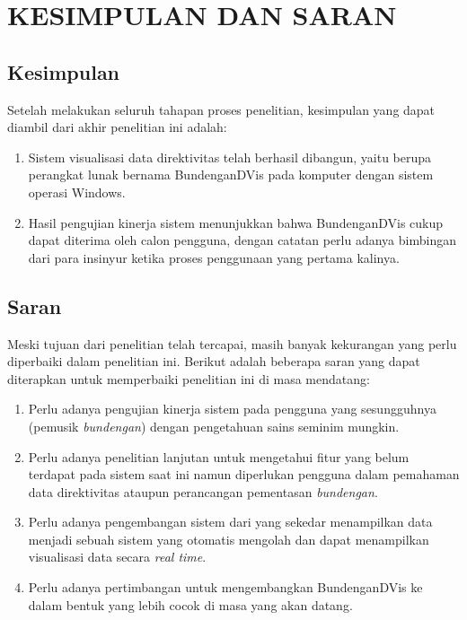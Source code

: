 \chapter{KESIMPULAN DAN SARAN} \label{kesimpulan-dan-saran}

\section{Kesimpulan}
Setelah melakukan seluruh tahapan proses penelitian, kesimpulan yang dapat diambil dari akhir penelitian ini adalah:
\begin{enumerate}
	\item Sistem visualisasi data direktivitas \bundengan telah berhasil dibangun, yaitu berupa perangkat lunak bernama BundenganDVis pada komputer dengan sistem operasi Windows.
	\item Hasil pengujian kinerja sistem menunjukkan bahwa BundenganDVis cukup dapat diterima oleh calon pengguna, dengan catatan perlu adanya bimbingan dari para insinyur ketika proses penggunaan yang pertama kalinya.
\end{enumerate}


\section{Saran}
Meski tujuan dari penelitian telah tercapai, masih banyak kekurangan yang perlu diperbaiki dalam penelitian ini. Berikut adalah beberapa saran yang dapat diterapkan untuk memperbaiki penelitian ini di masa mendatang:
\begin{enumerate}
	\item Perlu adanya pengujian kinerja sistem pada pengguna yang sesungguhnya (pemusik \emph{bundengan}) dengan pengetahuan sains seminim mungkin.
	\item Perlu adanya penelitian lanjutan untuk mengetahui fitur yang belum terdapat pada sistem saat ini namun diperlukan pengguna dalam pemahaman data direktivitas \bundengan ataupun perancangan pementasan \emph{bundengan}.
	\newpage
	\item Perlu adanya pengembangan sistem dari yang sekedar menampilkan data menjadi sebuah sistem yang otomatis mengolah dan dapat menampilkan visualisasi data secara \emph{real time}.
	\item Perlu adanya pertimbangan untuk mengembangkan BundenganDVis ke dalam bentuk yang lebih cocok di masa yang akan datang.
\end{enumerate}